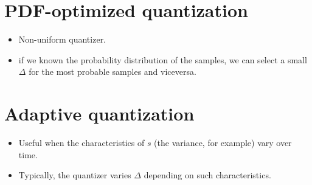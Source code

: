 \section{PDF-optimized quantization}
\begin{itemize}
\item
  Non-uniform quantizer.
\item
  if we known the probability distribution of the samples, we can select
  a small \(\Delta\) for the most probable samples and viceversa.
\end{itemize}


\section{Adaptive quantization}
\begin{itemize}
\item
  Useful when the characteristics of \(s\) (the variance, for example)
  vary over time.
\item
  Typically, the quantizer varies \(\Delta\) depending on such
  characteristics.
\end{itemize}

